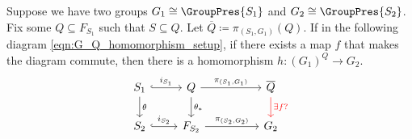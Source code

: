 \begin{theorem}
	Suppose we have two groups $G_1 \cong \GroupPres{S_1}$ and $G_2 \cong \GroupPres{S_2}$.
	Fix some $Q \subseteq F_{S_1}$ such that  $S \subseteq Q$.
	Let $\overline{Q} \coloneqq \pi_{(S_1, G_1)}(Q) $.
	If in the following diagram \eqref{eqn:G_Q_homomorphism_setup}, if there exists a map $f$ that makes the diagram commute, then there is a homomorphism $h \colon (G_1)^Q \to G_2$.
	\begin{equation}
		\begin{tikzcd}
			S_1 \ar[d, "\theta"] \ar[r, hook, "i_{S_1}"] & Q \ar[d, "\theta_*"] \ar[rr, "\pi_{(S_1,G_1)}"] & & \overline{Q} \ar[d, color=red, "\exists f ?"] \\
			S_2 \ar[r, hook, "i_{S_2}"] & F_{S_2} \ar[rr, "\pi_{(S_2,G_2)}"] & & G_2
		\end{tikzcd}
		\label{eqn:G_Q_homomorphism_setup}
	\end{equation}
	\label{thm:G_Q_homomorphism}
\end{theorem}

